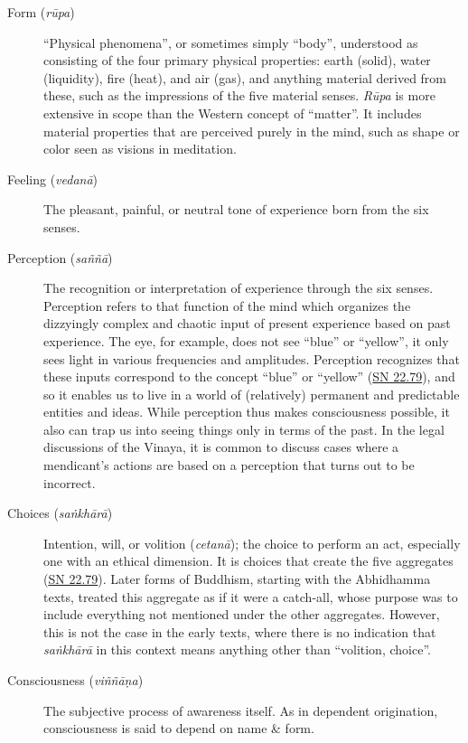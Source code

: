 \documentclass[12pt,openany]{book}%
\begin{document}
\begin{description}%
\item[Form (\textit{\textsanskrit{rūpa}})] “Physical phenomena”, or sometimes simply “body”, understood as consisting of the four primary physical properties: earth (solid), water (liquidity), fire (heat), and air (gas), and anything material derived from these, such as the impressions of the five material senses.
\textit{\textsanskrit{Rūpa}} is more extensive in scope than the Western concept of “matter”. It includes material properties that are perceived purely in the mind, such as shape or color seen as visions in meditation.%
\item[Feeling (\textit{\textsanskrit{vedanā}})] The pleasant, painful, or neutral tone of experience born from the six senses.%
\item[Perception (\textit{\textsanskrit{saññā}})] The recognition or interpretation of experience through the six senses.
Perception refers to that function of the mind which organizes the dizzyingly complex and chaotic input of present experience based on past experience. The eye, for example, does not see “blue” or “yellow”, it only sees light in various frequencies and amplitudes. Perception recognizes that these inputs correspond to the concept “blue” or “yellow” (\href{https://suttacentral.net/sn22.79}{SN 22.79}), and so it enables us to live in a world of (relatively) permanent and predictable entities and ideas. While perception thus makes consciousness possible, it also can trap us into seeing things only in terms of the past. In the legal discussions of the Vinaya, it is common to discuss cases where a mendicant’s actions are based on a perception that turns out to be incorrect.%
\item[Choices (\textit{\textsanskrit{saṅkhārā}})] Intention, will, or volition (\textit{\textsanskrit{cetanā}}); the choice to perform an act, especially one with an ethical dimension. It is choices that create the five aggregates (\href{https://suttacentral.net/sn22.79}{SN 22.79}).
Later forms of Buddhism, starting with the Abhidhamma texts, treated this aggregate as if it were a catch-all, whose purpose was to include everything not mentioned under the other aggregates. However, this is not the case in the early texts, where there is no indication that \textit{\textsanskrit{saṅkhārā}} in this context means anything other than “volition, choice”.%
\item[Consciousness (\textit{\textsanskrit{viññāṇa}})] The subjective process of awareness itself.
As in dependent origination, consciousness is said to depend on name \& form.%
\end{description}
\end{document}
